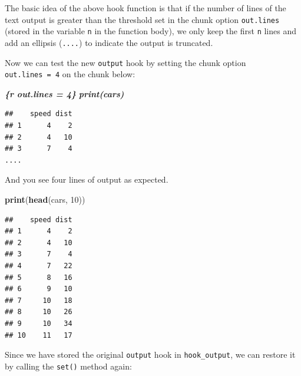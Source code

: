 \documentclass[
  a4paper,
  twoside,
  openright]{book}
\newenvironment{Shaded}{\begin{snugshade}}{\end{snugshade}}
\newcommand{\AttributeTok}[1]{\textcolor[rgb]{0.13,0.29,0.53}{#1}}
\newcommand{\DecValTok}[1]{\textcolor[rgb]{0.00,0.00,0.81}{#1}}
\newcommand{\FunctionTok}[1]{\textcolor[rgb]{0.13,0.29,0.53}{\textbf{#1}}}
\newcommand{\InformationTok}[1]{\textcolor[rgb]{0.56,0.35,0.01}{\textbf{\textit{#1}}}}
\newcommand{\NormalTok}[1]{#1}
\newcommand{\SpecialCharTok}[1]{\textcolor[rgb]{0.81,0.36,0.00}{\textbf{#1}}}
\theoremstyle{definition}
\theoremstyle{definition}
\theoremstyle{definition}
\theoremstyle{definition}
\theoremstyle{remark}
\begin{document}
The basic idea of the above hook function is that if the number of lines of the text output is greater than the threshold set in the chunk option \texttt{out.lines} (stored in the variable \texttt{n} in the function body), we only keep the first \texttt{n} lines and add an ellipsis (\texttt{....}) to indicate the output is truncated.

Now we can test the new \texttt{output} hook by setting the chunk option \texttt{out.lines\ =\ 4} on the chunk below:

\begin{Shaded}
\begin{Highlighting}[]
\InformationTok{\textasciigrave{}\textasciigrave{}\textasciigrave{}\{r out.lines = 4\}}
\InformationTok{print(cars)}
\InformationTok{\textasciigrave{}\textasciigrave{}\textasciigrave{}}
\end{Highlighting}
\end{Shaded}

\begin{verbatim}
##    speed dist
## 1      4    2
## 2      4   10
## 3      7    4
....
\end{verbatim}

And you see four lines of output as expected.

\begin{Shaded}
\begin{Highlighting}[]
\FunctionTok{print}\NormalTok{(}\FunctionTok{head}\NormalTok{(cars, }\DecValTok{10}\NormalTok{))}
\end{Highlighting}
\end{Shaded}

\begin{verbatim}
##    speed dist
## 1      4    2
## 2      4   10
## 3      7    4
## 4      7   22
## 5      8   16
## 6      9   10
## 7     10   18
## 8     10   26
## 9     10   34
## 10    11   17
\end{verbatim}

Since we have stored the original \texttt{output} hook in \texttt{hook\_output}, we can restore it by calling the \texttt{set()} method again:

\begin{Shaded}
\end{Shaded}
\end{document}
